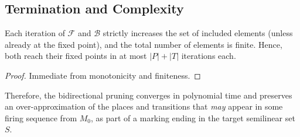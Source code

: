 \subsection{Termination and Complexity}

\begin{lemma}
	Each iteration of $\mathcal{F}$ and $\mathcal{B}$ strictly increases
	the set of included elements (unless already at the fixed point), and
	the total number of elements is finite.  Hence, both reach their
	fixed points in at most $|P|+|T|$ iterations each.
\end{lemma}

\begin{proof}
	Immediate from monotonicity and finiteness.
\end{proof}

\noindent
Therefore, the bidirectional pruning converges in polynomial time and preserves an over-approximation of the
places and transitions that \emph{may} appear in some firing sequence from
$M_0$, as part of a marking ending in the target semilinear set $S$.






